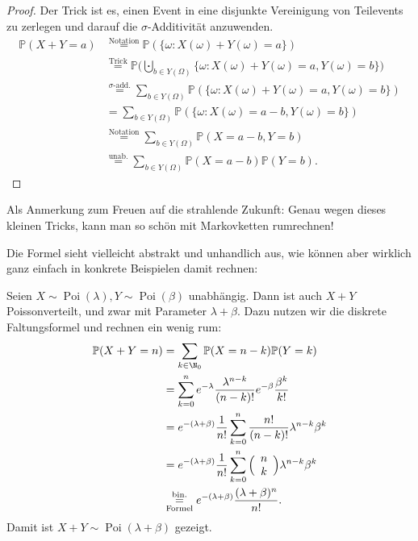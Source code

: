 \begin{proof}
	Der Trick ist es, einen Event in eine disjunkte Vereinigung von Teilevents zu zerlegen und darauf die $\sigma$-Additivit\"at anzuwenden.
	\begin{align*}
		\mathbb{P}(X+Y = a) &\overset{\text{Notation}}{=} \mathbb{P}(\{ \omega\colon X(\omega) + Y(\omega) = a \}) \\
		&\overset{\text{Trick}}{=} \mathbb{P}\Big(\bigcupdot_{b \in Y(\Omega)} \{ \omega\colon X(\omega) + Y(\omega) = a, Y(\omega) = b \} \Big)\\
		&\overset{\sigma\text{-add.}}{=} \sum\limits_{b \in Y(\Omega)} \mathbb{P}(\{ \omega\colon X(\omega) + Y(\omega) = a, Y(\omega) = b \})\\ 
		&= \sum\limits_{b \in Y(\Omega)} \mathbb{P}(\{ \omega\colon X(\omega) = a - b, Y(\omega) = b \})\\
		&\overset{\text{Notation}}{=} \sum\limits_{b \in Y(\Omega)} \mathbb{P}(X = a - b, Y = b )\\
		& \overset{\text{unab.}}{=} \sum\limits_{b \in Y(\Omega)} \mathbb{P}(X=a-b) \mathbb{P}(Y=b).
	\end{align*}
\end{proof}
Als Anmerkung zum Freuen auf die strahlende Zukunft: Genau wegen dieses kleinen Tricks, kann man so sch\"on mit Markovketten rumrechnen!\smallskip

Die Formel sieht vielleicht abstrakt und unhandlich aus, wie k\"onnen aber wirklich ganz einfach in konkrete Beispielen damit rechnen:
\begin{beispiel}
	Seien $X \sim \operatorname{Poi}(\lambda), Y \sim \operatorname{Poi}(\beta)$ unabhängig. Dann ist auch $X+Y$ Poissonverteilt, und zwar mit Parameter $\lambda+\beta$. Dazu nutzen wir die diskrete Faltungsformel und rechnen ein wenig rum:
	\begin{align*}
		\mathbb{P}(X+Y=n) &= \sum\limits_{k \in \N_0} \mathbb{P}(X = n-k)\mathbb{P}(Y = k)\\
		& = \sum\limits_{k=0}^{n} e^{-\lambda} \frac{\lambda^{n-k}}{(n-k)!} e^{-\beta} \frac{\beta^{k}}{k!}\\
		&= e^{-(\lambda + \beta)} \frac{1}{n!} \sum\limits_{k=0}^{n} \frac{n!}{(n-k)!} \lambda^{n-k} \beta^{k}\\
		& = e^{-(\lambda + \beta)} \frac{1}{n!} \sum\limits_{k=0}^{n} \Big(\begin{array}{c} n\\ k\end{array}\Big) \lambda^{n-k} \beta^{k}\\
		& \overset{\text{bin.}}{\underset{\text{Formel}}{=}} e^{-(\lambda + \beta)} \frac{(\lambda + \beta)^n}{n!}.
	\end{align*}
	Damit ist $X+Y\sim \operatorname{Poi}(\lambda+\beta)$ gezeigt.
\end{beispiel}



